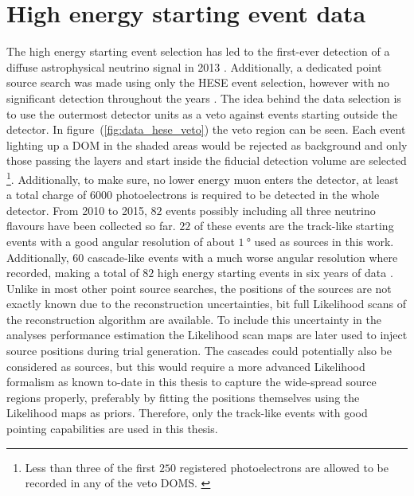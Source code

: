 \section{High energy starting event data}
The high energy starting event selection has led to the first-ever detection of a diffuse astrophysical neutrino signal in 2013 \cite{Aartsen:2013jdh}.
Additionally, a dedicated point source search was made using only the HESE event selection, however with no significant detection throughout the years \cite{Aartsen:2013rt,Aartsen:2014gkd,Kopper:2015vzf,Kopper:2017zzm}.
The idea behind the data selection is to use the outermost detector units as a veto against events starting outside the detector.
In figure~(\ref{fig:data_hese_veto}) the veto region can be seen.
Each event lighting up a DOM in the shaded areas would be rejected as background and only those passing the layers and start inside the fiducial detection volume are selected \footnote{Less than three of the first $\num{250}$ registered photoelectrons are allowed to be recorded in any of the veto DOMS. \cite{Kopper:2017zzm}}.
Additionally, to make sure, no lower energy muon enters the detector, at least a total charge of $\num{6000}$ photoelectrons is required to be detected in the whole detector.
From 2010 to 2015, $\num{82}$ events possibly including all three neutrino flavours have been collected so far.
$\num{22}$ of these events are the track-like starting events with a good angular resolution of about $\SI{1}{\degree}$ used as sources in this work.
Additionally, $\num{60}$ cascade-like events with a much worse angular resolution where recorded, making a total of $\num{82}$ high energy starting events in six years of data \cite{Kopper:2017zzm}.
Unlike in most other point source searches, the positions of the sources are not exactly known due to the reconstruction uncertainties, bit full Likelihood scans of the reconstruction algorithm are available.
To include this uncertainty in the analyses performance estimation the Likelihood scan maps are later used to inject source positions during trial generation.
The cascades could potentially also be considered as sources, but this would require a more advanced Likelihood formalism as known to-date in this thesis to capture the wide-spread source regions properly, preferably by fitting the positions themselves using the Likelihood maps as priors.
Therefore, only the track-like events with good pointing capabilities are used in this thesis.


